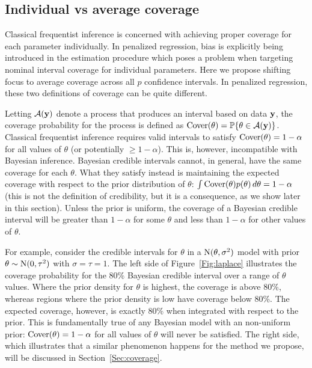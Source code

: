 \subsection{Individual vs average coverage}
\label{Sec:IAC}

Classical frequentist inference is concerned with achieving proper coverage for each parameter individually. In penalized regression, bias is explicitly being introduced in the estimation procedure which poses a problem when targeting nominal interval coverage for individual parameters. Here we propose shifting focus to average coverage across all $p$ confidence intervals. In penalized regression, these two definitions of coverage can be quite different.

Letting $\mathcal{A}(\mathbf{y})$ denote a process that produces an interval based on data $\mathbf{y}$, the coverage probability for the process is defined as $\textrm{Cover}(\theta) = \mathbb{P}\{\theta \in \mathcal{A}(\mathbf{y})\}$. Classical frequentist inference requires valid intervals to satisfy $\textrm{Cover}(\theta) = 1 - \alpha$ for all values of $\theta$ (or potentially $\ge 1 - \alpha$). This is, however, incompatible with Bayesian inference. Bayesian credible intervals cannot, in general, have the same coverage for each $\theta$. What they satisfy instead is maintaining the expected coverage with respect to the prior distribution of $\theta$: $\int \textrm{Cover}(\theta)p(\theta) \, d\theta = 1 - \alpha$ (this is not the definition of credibility, but it is a consequence, as we show later in this section). Unless the prior is uniform, the coverage of a Bayesian credible interval will be greater than $1-\alpha$ for some $\theta$ and less than $1-\alpha$ for other values of $\theta$.

For example, consider the credible intervals for $\theta$ in a $\textrm{N}(\theta, \sigma^2)$ model with prior $\theta \sim \textrm{N}(0, \tau^2)$ with $\sigma = \tau = 1$. The left side of Figure~\ref{Fig:laplace} illustrates the coverage probability for the 80\% Bayesian credible interval over a range of $\theta$ values. Where the prior density for $\theta$ is highest, the coverage is above 80\%, whereas regions where the prior density is low have coverage below 80\%. The expected coverage, however, is exactly 80\% when integrated with respect to the prior. This is fundamentally true of any Bayesian model with an non-uniform prior: $\textrm{Cover}(\theta) = 1 - \alpha$ for all values of $\theta$ will never be satisfied. The right side, which illustrates that a similar phenomenon happens for the method we propose, will be discussed in Section~\ref{Sec:coverage}.

